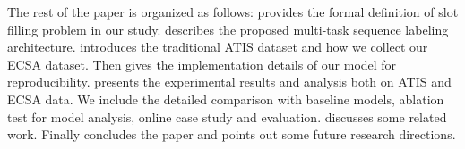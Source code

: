 The rest of the paper is organized as follows:
 provides the formal definition of slot filling problem in our study.
 describes the proposed multi-task sequence labeling architecture.
 introduces the traditional ATIS dataset and how we collect our ECSA dataset.
Then  gives the implementation details of our model for reproducibility.
 presents the experimental results and analysis both on ATIS and ECSA data.
We include the detailed comparison with baseline models, ablation test for model analysis, online case study and evaluation.
 discusses some related work.
Finally  concludes the paper and points out some 
future research directions.
